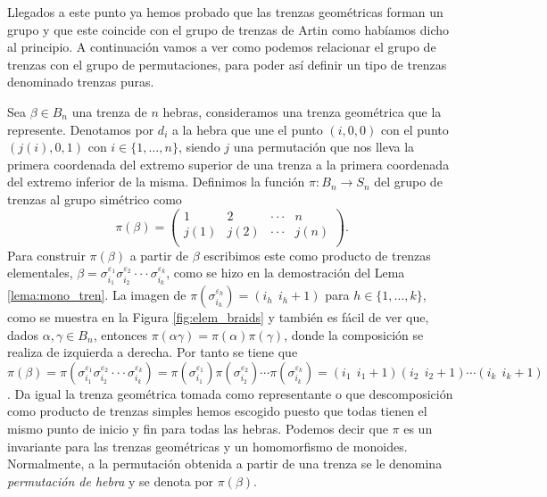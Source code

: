 \documentclass[12pt]{book}
\theoremstyle{definition}
\begin{document}
Llegados a este punto ya hemos probado que las trenzas geométricas forman un grupo y que este coincide con el grupo de trenzas de Artin como habíamos dicho al principio. A continuación vamos a ver como podemos relacionar el grupo de trenzas con el grupo de permutaciones, para poder así definir un tipo de trenzas denominado trenzas puras.

Sea $\beta\in B_n$ una trenza de $n$ hebras, consideramos una trenza geométrica que la represente. Denotamos por $d_i$ a la hebra que une el punto $(i,0,0)$ con el punto $(j(i),0,1)$ con $i \in\{ 1,\ldots,n\}$, siendo $j$ una permutación que nos lleva la primera coordenada del extremo superior de una trenza a la primera coordenada del extremo inferior de la misma. Definimos la función $\pi:B_n\rightarrow S_n$ del grupo de trenzas al grupo simétrico como
$$\pi(\beta) = \begin{pmatrix}
1 & 2 & \cdot\cdot\cdot & n\\
j(1) & j(2) & \cdot\cdot\cdot & j(n)\\
\end{pmatrix}. $$
Para construir $\pi(\beta)$ a partir de $\beta$ escribimos este como producto de trenzas elementales, $\beta = \sigma_{i_1}^{\varepsilon_1}\sigma_{i_2}^{\varepsilon_2}\cdot\cdot\cdot\sigma_{i_k}^{\varepsilon_k}$, como se hizo en la demostración del Lema \ref{lema:mono_tren}. La imagen de $\pi(\sigma_{i_h}^{\varepsilon_h})=(i_h\ \ i_h+1)$ para $h\in\{1,\ldots,k\}$, como se muestra en la Figura \ref{fig:elem_braids} y también es fácil de ver que, dados $\alpha,\gamma\in B_n$, entonces $\pi(\alpha\gamma)=\pi(\alpha)\pi(\gamma)$, donde la composición se realiza de izquierda a derecha. Por tanto se tiene que $\pi(\beta)=\pi(\sigma_{i_1}^{\varepsilon_1}\sigma_{i_2}^{\varepsilon_2}\cdot\cdot\cdot\sigma_{i_k}^{\varepsilon_k})=\pi(\sigma_{i_1}^{\varepsilon_1})\pi(\sigma_{i_2}^{\varepsilon_2})\cdots \pi(\sigma_{i_k}^{\varepsilon_k})=(i_1\ \ i_1+1)(i_2\ \ i_2+1)\cdots (i_k\ \ i_k+1)$.
Da igual la trenza geométrica tomada como representante o que descomposición como producto de trenzas simples hemos escogido puesto que todas tienen el mismo punto de inicio y fin para todas las hebras. Podemos decir que $\pi$ es un invariante para las trenzas geométricas y un homomorfismo de monoides. Normalmente, a la permutación obtenida a partir de una trenza se le denomina \textit{permutación de hebra} y se denota por $\pi(\beta)$.
\end{document}
